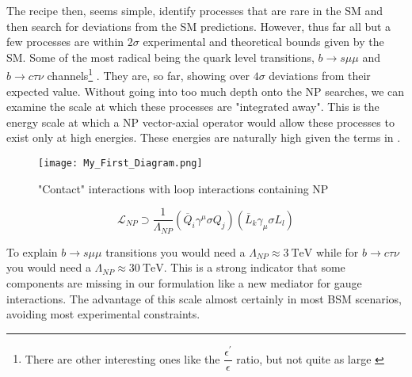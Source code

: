 The recipe then, seems simple, identify processes that are rare in the SM and then search for deviations from the SM predictions.
%
However, thus far all but a few processes are within $2\sigma$ experimental and theoretical bounds given by the SM. 
%
Some of the most radical being the quark level transitions, $b \rightarrow s \mu \mu$ \cite{DAmico2017,Geng_2017} and $b \rightarrow c \tau \nu$ channels\footnote{There are other interesting ones like the $\dfrac{\epsilon^\prime}{\epsilon}$ ratio, but not quite as large \cite{Buras2015}} \cite{Fajfer_2012}. 
%
They are, so far, showing over $ 4 \sigma$ deviations from their expected value. 
%
Without going into too much depth onto the NP searches, we can examine the scale at which these processes are "integrated away". 
%
This is the energy scale at which a NP vector-axial operator would allow these processes to exist only at high energies. These energies are naturally high given the terms in \Joaoadd{\eqref{eq:NP}}. 
%
\bigbreak
%
\noindent\begin{minipage}{.35\textwidth}
	\begin{figure}[H]
		\label{fig:contactNP}
		\centering
		\texttt{[image: My\_First\_Diagram.png]}
		\caption{"Contact" interactions with loop interactions containing NP}
	\end{figure}
\end{minipage}
\begin{minipage}{.6\textwidth}
\begin{equation}
\label{eq:NP}
\mathcal{L}_{NP} \supset \frac{1}{\Lambda_{NP}} (\overline{Q}_i \gamma^\mu \sigma Q_j ) (\overline{L}_k \gamma_\mu \sigma L_l) 
\end{equation}
\end{minipage}
%
\bigbreak
%
To explain $b \rightarrow s \mu \mu$ transitions you would need a $\Lambda_{NP} \approx 3 \ \text{TeV}$ while for $b \rightarrow c \tau \nu$ you would need a $\Lambda_{NP} \approx 30\ \text{TeV}$. This is a strong indicator that some components are missing in our formulation like a new mediator for gauge interactions. The{} advantage of this scale  almost certainly in most BSM scenarios, avoiding most experimental constraints.

